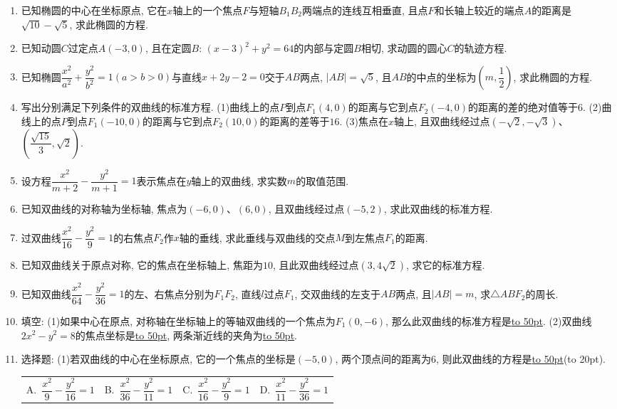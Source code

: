 \documentclass[10pt,a4paper]{article}
\newcommand{\blank}[1]{\underline{\hbox to #1pt{}}}
\newcommand{\bracket}[1]{(\hbox to #1pt{})}
\newcommand{\fourch}[4]{\par\begin{tabular}{p{.23\textwidth}p{.23\textwidth}p{.23\textwidth}p{.23\textwidth}}
A.~#1 &B.~#2& C.~#3& D.~#4
\end{tabular}}
\begin{document}
\begin{enumerate}[1.]
(1)椭圆$\dfrac{x^2}{25}+\dfrac{y^2}9=1$与$\dfrac{x^2}{9-k}+\dfrac{y^2}{25-k}=1(0<k<9)$的关系是\blank{50}\bracket{20}.
\fourch{有相等的长轴和短轴}{有相等的焦距}{有相同的焦点}{有相同的顶点}
(2)在$\triangle ABC$中, 已知$A(-1,0)$、$C(1,0)$.若$a>b>c$, 且满足$2\sin B=\sin A+\sin C$, 则顶点$B$的轨迹的方程是\blank{50}\bracket{20}.
\fourch{$\dfrac{x^2}4+\dfrac{y^2}3=1(x<0)$}{$\dfrac{x^2}3+\dfrac{y^2}4=1(x<0)$}{$\dfrac{x^2}4+\dfrac{y^2}3=1(x>0)$}{$\dfrac{x^2}3+\dfrac{y^2}4=1(x>0)$}
\item 已知椭圆的中心在坐标原点, 它在$x$轴上的一个焦点$F$与短轴$B_1B_2$两端点的连线互相垂直, 且点$F$和长轴上较近的端点$A$的距离是$\sqrt {10}-\sqrt 5$, 求此椭圆的方程.
\item 已知动圆$C$过定点$A(-3,0)$, 且在定圆$B$: $(x-3)^2+y^2=64$的内部与定圆$B$相切, 求动圆的圆心$C$的轨迹方程.
\item 已知椭圆$\dfrac{x^2}{a^2}+\dfrac{y^2}{b^2}=1(a>b>0)$与直线$x+2y-2=0$交于$AB$两点, $|AB|=\sqrt 5$, 且$AB$的中点的坐标为$(m,\dfrac 12)$, 求此椭圆的方程.
\item 写出分别满足下列条件的双曲线的标准方程.
(1)曲线上的点$P$到点$F_1(4,0)$的距离与它到点$F_2(-4,0)$的距离的差的绝对值等于$6$.
(2)曲线上的点$P$到点$F_1(-10,0)$的距离与它到点$F_2(10,0)$的距离的差等于$16$.
(3)焦点在$x$轴上, 且双曲线经过点$(-\sqrt 2,-\sqrt 3)$、$(\dfrac{\sqrt {15}}3,\sqrt 2)$.
\item 设方程$\dfrac{x^2}{m+2}-\dfrac{y^2}{m+1}=1$表示焦点在$y$轴上的双曲线, 求实数$m$的取值范围.
\item 已知双曲线的对称轴为坐标轴, 焦点为$(-6,0)$、$(6,0)$, 且双曲线经过点$(-5,2)$, 求此双曲线的标准方程.
\item 过双曲线$\dfrac{x^2}{16}-\dfrac{y^2}9=1$的右焦点$F_2$作$x$轴的垂线, 求此垂线与双曲线的交点$M$到左焦点$F_1$的距离.
\item 已知双曲线关于原点对称, 它的焦点在坐标轴上, 焦距为$10$, 且此双曲线经过点$(3,4\sqrt 2)$, 求它的标准方程.
\item 已知双曲线$\dfrac{x^2}{64}-\dfrac{y^2}{36}=1$的左、右焦点分别为$F_1F_2$, 直线$l$过点$F_1$, 交双曲线的左支于$AB$两点, 且$|AB|=m$, 求$\triangle ABF_2$的周长.
\item 填空:
(1)如果中心在原点, 对称轴在坐标轴上的等轴双曲线的一个焦点为$F_1(0,-6)$, 那么此双曲线的标准方程是\blank{50}.
(2)双曲线$2x^2-y^2=8$的焦点坐标是\blank{50}, 两条渐近线的夹角为\blank{50}.
\item 选择题:
(1)若双曲线的中心在坐标原点, 它的一个焦点的坐标是$(-5,0)$, 两个顶点间的距离为$6$, 则此双曲线的方程是\blank{50}\bracket{20}.
\fourch{$\dfrac{x^2}9-\dfrac{y^2}{16}=1$}{$\dfrac{x^2}{36}-\dfrac{y^2}{11}=1$}{$\dfrac{x^2}{16}-\dfrac{y^2}9=1$}{$\dfrac{x^2}{11}-\dfrac{y^2}{36}=1$}

\end{enumerate}
\end{document}
